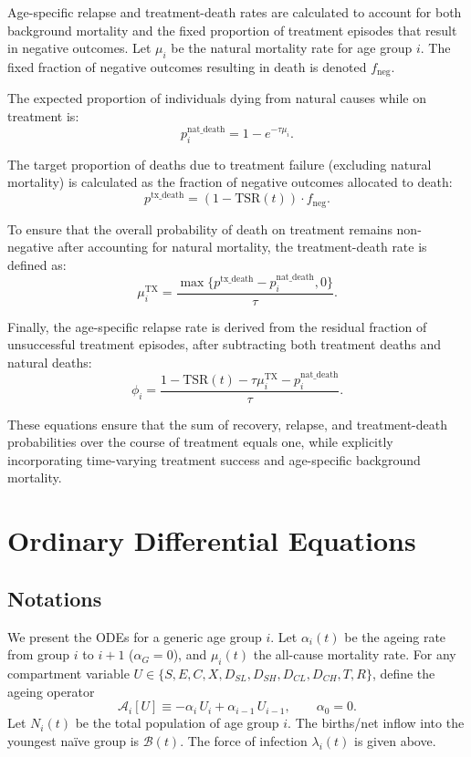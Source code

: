 \documentclass[11pt]{article}
\begin{document}
Age-specific relapse and treatment-death rates are calculated to account for both background mortality and the fixed proportion of treatment episodes that result in negative outcomes. Let \(\mu_i\) be the natural mortality rate for age group \(i\). The fixed fraction of negative outcomes resulting in death is denoted \(f_\text{neg}\).

The expected proportion of individuals dying from natural causes while on treatment is:
\[
p^{\text{nat\_death}}_i = 1 - e^{-\tau \mu_i}.
\]

The target proportion of deaths due to treatment failure (excluding natural mortality) is calculated as the fraction of negative outcomes allocated to death:
\[
p^{\text{tx\_death}} = (1 - \text{TSR}(t)) \cdot f_\text{neg}.
\]

To ensure that the overall probability of death on treatment remains non-negative after accounting for natural mortality, the treatment-death rate is defined as:
\[ 
\mu^{\text{TX}}_i = \frac{\max \{ p^{\text{tx\_death}} - p^{\text{nat\_death}}_i, 0 \}}{\tau}.
\]

Finally, the age-specific relapse rate is derived from the residual fraction of unsuccessful treatment episodes, after subtracting both treatment deaths and natural deaths:
\[
\phi_i = \frac{1 - \text{TSR}(t) - \tau \mu^{\text{TX}}_i - p^{\text{nat\_death}}_i}{\tau}.
\] 

These equations ensure that the sum of recovery, relapse, and treatment-death probabilities over the course of treatment equals one, while explicitly incorporating time-varying treatment success and age-specific background mortality.

\section{Ordinary Differential Equations}
\label{sec:odes}

\subsection{Notations}
We present the ODEs for a generic age group \(i\). Let \(\alpha_i(t)\) be the ageing rate from group \(i\) to \(i{+}1\) (\(\alpha_G=0\)), and \(\mu_i(t)\) the all-cause mortality rate. For any compartment variable \(U\in\{S,E,C,X,D_{SL},D_{SH},D_{CL},D_{CH},T,R\}\), define the ageing operator
\[
\mathcal{A}_i[U] \equiv -\alpha_i\, U_i + \alpha_{i-1}\, U_{i-1},\qquad \alpha_0=0.
\]
Let \(N_i(t)\) be the total population of age group \(i\). The births/net inflow into the youngest na\"ive group is \(\mathcal{B}(t)\). The force of infection \(\lambda_i(t)\) is given above.
\end{document}

